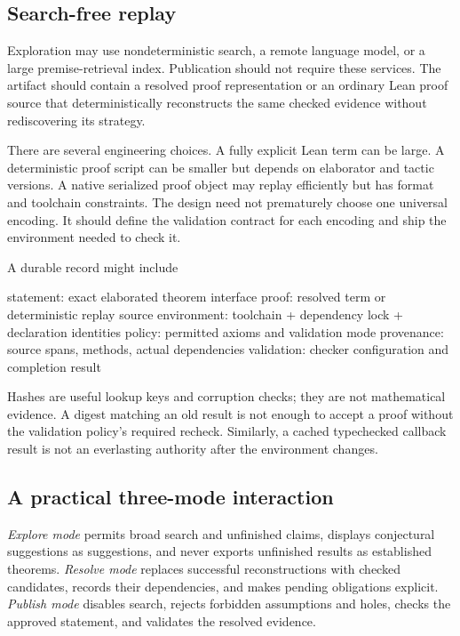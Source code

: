 \documentclass[11pt,a4paper]{article}
\theoremstyle{remark}
\begin{document}
\subsection{Search-free replay}\label{sec:replay}

Exploration may use nondeterministic search, a remote language model, or a large premise-retrieval index. Publication should not require these services. The artifact should contain a resolved proof representation or an ordinary Lean proof source that deterministically reconstructs the same checked evidence without rediscovering its strategy.

There are several engineering choices. A fully explicit Lean term can be large. A deterministic proof script can be smaller but depends on elaborator and tactic versions. A native serialized proof object may replay efficiently but has format and toolchain constraints. The design need not prematurely choose one universal encoding. It should define the validation contract for each encoding and ship the environment needed to check it.

A durable record might include
\begin{Code}
statement:       exact elaborated theorem interface
proof:           resolved term or deterministic replay source
environment:     toolchain + dependency lock + declaration identities
policy:          permitted axioms and validation mode
provenance:      source spans, methods, actual dependencies
validation:      checker configuration and completion result
\end{Code}
Hashes are useful lookup keys and corruption checks; they are not mathematical evidence. A digest matching an old result is not enough to accept a proof without the validation policy's required recheck. Similarly, a cached typechecked callback result is not an everlasting authority after the environment changes.

\subsection{A practical three-mode interaction}

\emph{Explore mode} permits broad search and unfinished claims, displays conjectural suggestions as suggestions, and never exports unfinished results as established theorems. \emph{Resolve mode} replaces successful reconstructions with checked candidates, records their dependencies, and makes pending obligations explicit. \emph{Publish mode} disables search, rejects forbidden assumptions and holes, checks the approved statement, and validates the resolved evidence.
\end{document}
